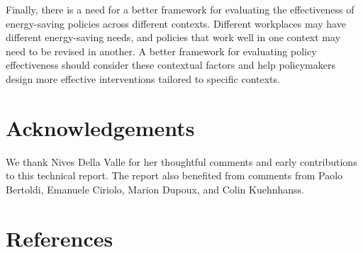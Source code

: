 \documentclass[
  11pt,
]{article}
\begin{document}
Finally, there is a need for a better framework for evaluating the
effectiveness of energy-saving policies across different contexts.
Different workplaces may have different energy-saving needs, and
policies that work well in one context may need to be revised in
another. A better framework for evaluating policy effectiveness should
consider these contextual factors and help policymakers design more
effective interventions tailored to specific contexts.

\hypertarget{acknowledgements}{%
\section*{Acknowledgements}\label{acknowledgements}}

We thank Nives Della Valle for her thoughtful comments and early
contributions to this technical report. The report also benefited from
comments from Paolo Bertoldi, Emanuele Ciriolo, Marion Dupoux, and Colin
Kuehnhanss.

\hypertarget{references}{%
\section*{References}\label{references}}
\end{document}

